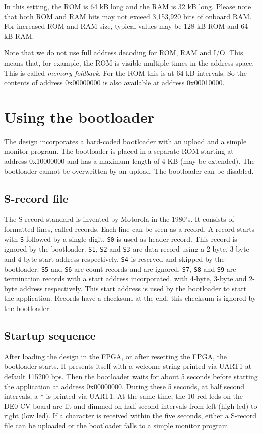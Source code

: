 \documentclass[12pt]{article}
\begin{document}
In this setting, the ROM is 64 kB long and the RAM is 32 kB long. Please note that both ROM and RAM bits may not exceed 3,153,920 bits of onboard RAM. For increased ROM and RAM size, typical values may be 128 kB ROM and 64 kB RAM.

Note that we do not use full address decoding for ROM, RAM and I/O. This means that, for example, the ROM is visible multiple times in the address space. This is called \emph{memory foldback}. For the ROM this is at 64 kB intervals. So the contents of address 0x00000000 is also available at address 0x00010000.

\section{Using the bootloader}
\label{sec:bootloader}
The design incorporates a hard-coded bootloader with an upload and a simple monitor program. The bootloader is placed in a separate ROM starting at address 0x10000000 and has a maximum length of 4 KB (may be extended). The bootloader cannot be overwritten by an upload. The bootloader can be disabled.

\subsection{S-record file}
The S-record standard is invented by Motorola in the 1980's. It consists of formatted lines, called records. Each line can be seen as a record. A record starts with \lstinline|S| followed by a single digit. \lstinline|S0| is used as header record. This record is ignored by the bootloader. \lstinline|S1|,  \lstinline|S2| and \lstinline|S3| are data record using a 2-byte, 3-byte and 4-byte start address respectively. \lstinline|S4| is reserved and skipped by the bootloader. \lstinline|S5| and \lstinline|S6| are count records and are ignored. \lstinline|S7|, \lstinline|S8| and \lstinline|S9| are termination records with a start address incorporated, with 4-byte, 3-byte and 2-byte address respectively. This start address is used by the bootloader to start the application. Records have a checksum at the end, this checksum is ignored by the bootloader.

\subsection{Startup sequence}
After loading the design in the FPGA, or after resetting the FPGA, the bootloader starts. It presents itself with a welcome string printed via UART1 at default 115200 bps. Then the bootloader waits for about 5 seconds before starting the application at address 0x00000000. During these 5 seconds, at half second intervals, a \lstinline|*| is printed via UART1. At the same time, the 10 red leds on the DE0-CV board are lit and dimmed on half second intervals from left (high led) to right (low led). If a character is received within the five seconds, either a S-record file can be uploaded or the bootloader falls to a simple monitor program.
\end{document}
